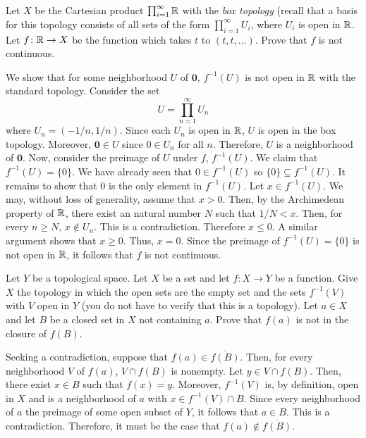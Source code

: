 \begin{problem}
  Let \(X\) be the Cartesian product \(\prod_{i=1}^\infty\mathbb{R}\) with the
  \emph{box topology} (recall that a basis for this topology consists of
  all sets of the form \(\prod_{i=1}^\infty U_i\), where \(U_i\) is open in
  \(\mathbb{R}\). Let \(f\colon\mathbb{R}\to X\) be the function which takes \(t\) to
  \((t,t,\ldots)\). Prove that \(f\) is not continuous.
\end{problem}
\begin{solution}
  We show that for some neighborhood \(U\) of \(\mathbf{0}\), \(f^{-1}(U)\)
  is not open in \(\mathbb{R}\) with the standard topology. Consider the set
  \[
    U=\prod_{n=1}^\infty U_n
  \]
  where \(U_n=(-1/n,1/n)\). Since each \(U_n\) is open in \(\mathbb{R}\), \(U\)
  is open in the box topology. Moreover, \(\mathbf{0}\in U\) since
  \(0\in U_n\) for all \(n\). Therefore, \(U\) is a neighborhood of
  \(\mathbf{0}\). Now, consider the preimage of \(U\) under \(f\),
  \(f^{-1}(U)\). We claim that \(f^{-1}(U)=\{0\}\). We have already seen
  that \(0\in f^{-1}(U)\) so \(\{0\}\subseteq f^{-1}(U)\). It remains to
  show that \(0\) is the only element in \(f^{-1}(U)\). Let
  \(x\in f^{-1}(U)\). We may, without loss of generality, assume that
  \(x>0\). Then, by the Archimedean property of \(\mathbb{R}\), there exist an
  natural number \(N\) such that \(1/N<x\). Then, for every \(n\geq N\),
  \(x\notin U_n\). This is a contradiction. Therefore \(x\leq 0\). A
  similar argument shows that \(x\geq 0\). Thus, \(x=0\). Since the
  preimage of \(f^{-1}(U)=\{0\}\) is not open in \(\mathbb{R}\), it follows that
  \(f\) is not continuous.
\end{solution}

\begin{problem}
  Let \(Y\) be a topological space. Let \(X\) be a set and let
  \(f\colon X\to Y\) be a function. Give \(X\) the topology in which the
  open sets are the empty set and the sets \(f^{-1}(V)\) with \(V\) open in
  \(Y\) (you do not have to verify that this is a topology). Let \(a\in X\)
  and let \(B\) be a closed set in \(X\) not containing \(a\). Prove that
  \(f(a)\) is not in the closure of \(f(B)\).
\end{problem}
\begin{solution}
  Seeking a contradiction, suppose that \(f(a)\in\overline{f(B)}\). Then,
  for every neighborhood \(V\) of \(f(a)\), \(V\cap f(B)\) is nonempty. Let
  \(y\in V\cap f(B)\). Then, there exist \(x\in B\) such that
  \(f(x)=y\). Moreover, \(f^{-1}(V)\) is, by definition, open in \(X\) and
  is a neighborhood of \(a\) with \(x\in f^{-1}(V)\cap B\). Since every
  neighborhood of \(a\) the preimage of some open subset of \(Y\), it
  follows that \(a\in B\). This is a contradiction. Therefore, it must be
  the case that \(f(a)\notin\overline{f(B)}\).
\end{solution}

